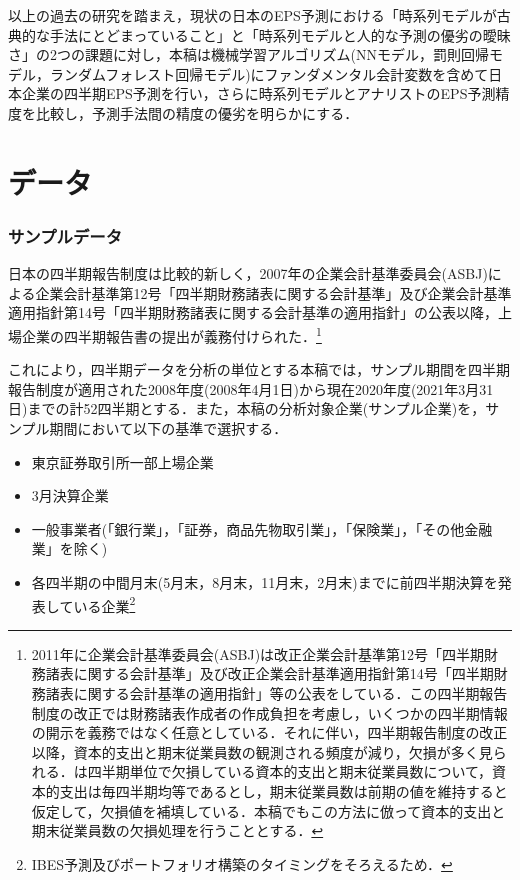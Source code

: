 \documentclass[a4paper，12pt]{jsarticle}
\begin{document}

以上の過去の研究を踏まえ，現状の日本のEPS予測における「時系列モデルが古典的な手法にとどまっていること」と「時系列モデルと人的な予測の優劣の曖昧さ」の2つの課題に対し，本稿は機械学習アルゴリズム(NNモデル，罰則回帰モデル，ランダムフォレスト回帰モデル)にファンダメンタル会計変数を含めて日本企業の四半期EPS予測を行い，さらに時系列モデルとアナリストのEPS予測精度を比較し，予測手法間の精度の優劣を明らかにする．

\part{データ} \label{par:data}

\section{サンプルデータ} \label{sec:sample}

日本の四半期報告制度は比較的新しく，2007年の企業会計基準委員会(ASBJ)による企業会計基準第12号「四半期財務諸表に関する会計基準」及び企業会計基準適用指針第14号「四半期財務諸表に関する会計基準の適用指針」の公表以降，上場企業の四半期報告書の提出が義務付けられた．\footnote{2011年に企業会計基準委員会(ASBJ)は改正企業会計基準第12号「四半期財務諸表に関する会計基準」及び改正企業会計基準適用指針第14号「四半期財務諸表に関する会計基準の適用指針」等の公表をしている．この四半期報告制度の改正では財務諸表作成者の作成負担を考慮し，いくつかの四半期情報の開示を義務ではなく任意としている．それに伴い，四半期報告制度の改正以降，資本的支出と期末従業員数の観測される頻度が減り，欠損が多く見られる．\cite{zhang2004neural}は四半期単位で欠損している資本的支出と期末従業員数について，資本的支出は毎四半期均等であるとし，期末従業員数は前期の値を維持すると仮定して，欠損値を補填している．本稿でもこの方法に倣って資本的支出と期末従業員数の欠損処理を行うこととする．}

これにより，四半期データを分析の単位とする本稿では，サンプル期間を四半期報告制度が適用された2008年度(2008年4月1日)から現在2020年度(2021年3月31日)までの計52四半期とする．また，本稿の分析対象企業(サンプル企業)を，サンプル期間において以下の基準で選択する．

\begin{itemize}
  \item 東京証券取引所一部上場企業
  \item 3月決算企業
  \item 一般事業者(「銀行業」，「証券，商品先物取引業」，「保険業」，「その他金融業」を除く)
  \item 各四半期の中間月末(5月末，8月末，11月末，2月末)までに前四半期決算を発表している企業\footnote{IBES予測及びポートフォリオ構築のタイミングをそろえるため．}
\end{itemize}
\end{document}
